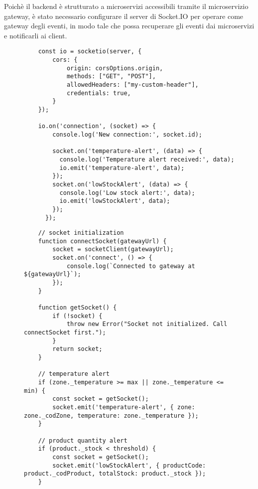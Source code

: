 Poichè il backend è strutturato a microservizi accessibili tramite il microservizio gateway, è stato necessario configurare il server di Socket.IO per operare come gateway degli eventi, in modo tale che possa recuperare gli eventi dai microservizi e notificarli ai client.

\begin{figure}[H]
\centering
\begin{verbatim}
    const io = socketio(server, {
        cors: {
            origin: corsOptions.origin,
            methods: ["GET", "POST"],
            allowedHeaders: ["my-custom-header"],
            credentials: true,
        }
    });

    io.on('connection', (socket) => {
        console.log('New connection:', socket.id);
      
        socket.on('temperature-alert', (data) => {
          console.log('Temperature alert received:', data);
          io.emit('temperature-alert', data);
        });
        socket.on('lowStockAlert', (data) => {
          console.log('Low stock alert:', data);
          io.emit('lowStockAlert', data);
        });
      });
\end{verbatim}
\end{figure}

\begin{figure}[H]
\centering
\begin{verbatim}
    // socket initialization
    function connectSocket(gatewayUrl) {
        socket = socketClient(gatewayUrl);
        socket.on('connect', () => {
            console.log(`Connected to gateway at ${gatewayUrl}`);
        });
    }
    
    function getSocket() {
        if (!socket) {
            throw new Error("Socket not initialized. Call connectSocket first.");
        }
        return socket;
    }

    // temperature alert
    if (zone._temperature >= max || zone._temperature <= min) {
        const socket = getSocket();
        socket.emit('temperature-alert', { zone: zone._codZone, temperature: zone._temperature });
    }

    // product quantity alert
    if (product._stock < threshold) {
        const socket = getSocket();
        socket.emit('lowStockAlert', { productCode: product._codProduct, totalStock: product._stock });
    }
\end{verbatim}
\end{figure}

